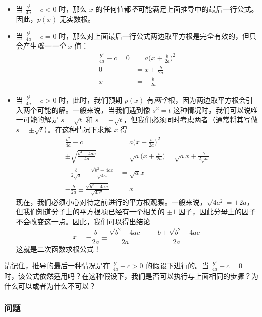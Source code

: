 \begin{itemize}
    \item 当 $\frac{b^2}{4a} -c < 0$ 时，那么 $x$ 的任何值都\emph{不}可能满足上面推导中的最后一行公式。因此，$p(x)$ 无实数根。
    \item 当 $\frac{b^2}{4a} -c = 0$ 时，那么对上面最后一行公式两边取平方根是完全有效的，但只会产生\emph{唯一一个 }$x$ 值：
    \begin{align*}
        \frac{b^2}{4a} -c = 0 &= a\Big(x+\frac{b}{2a}\Big)^2 \\
        0 &= x+\frac{b}{2a} \\
        x &= -\frac{b}{2a}
    \end{align*}
    \item 当 $\frac{b^2}{4a} -c > 0$ 时，此时，我们预期 $p(x)$ 有\emph{两个}根，因为两边取平方根会引入两个可能的解。一般来说，当我们遇到像 $s^2 = t$ 这种情况时，我们可以说唯一可能的解是 $s =\sqrt{t}$ 和 $s = -\sqrt{t}$，但我们必须同时考虑两者（通常将其写做 $s = \pm\sqrt{t}$）。在这种情况下求解 $x$ 得
    \begin{align*}
        \frac{b^2}{4a} -c &= a\Big(x+\frac{b}{2a}\Big)^2 \\
        \pm\sqrt{\frac{b^2-4ac}{4a}} &= \sqrt{a}\Big(x+\frac{b}{2a}\Big) = \sqrt{a}x+\frac{b}{2\sqrt{a}} \\
        -\frac{b}{2\sqrt{a}}\pm\frac{\sqrt{b^2-4ac}}{\sqrt{4a}} &= \sqrt{a}x \\
        -\frac{b}{2a}\pm\frac{\sqrt{b^2-4ac}}{\sqrt{4a^2}} &= x
    \end{align*}
    现在，我们必须小心对待之前进行的平方根观察。一般来说，$\sqrt{4a^2} = \pm2a$，但我们知道分子上的平方根项已经有一个相关的 $\pm1$ 因子，因此分母上的因子不会改变这一点。因此，我们可以得出结论
    \[x = -\frac{b}{2a}\pm\frac{\sqrt{b^2-4ac}}{2a} = \frac{-b\pm\sqrt{b^2-4ac}}{2a}\]
    这就是二次函数求根公式！
\end{itemize}

请记住，推导的最后一种情况是在 $\frac{b^2}{4a} -c > 0$ 的假设下进行的。当 $\frac{b^2}{4a} -c = 0$ 时，该公式依然适用吗？在这种假设下，我们是否可以执行与上面相同的步骤？为什么可以或者为什么不可以？

\subsubsection*{问题}

